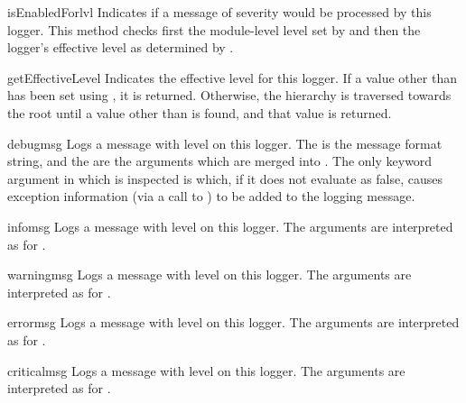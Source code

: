 \begin{methoddesc}{isEnabledFor}{lvl}
Indicates if a message of severity  would be processed by
this logger.  This method checks first the module-level level set by
 and then the logger's effective level as
determined by .
\end{methoddesc}

\begin{methoddesc}{getEffectiveLevel}{}
Indicates the effective level for this logger. If a value other than
 has been set using , it is returned.
Otherwise, the hierarchy is traversed towards the root until a value
other than  is found, and that value is returned.
\end{methoddesc}

\begin{methoddesc}{debug}{msg}
Logs a message with level  on this logger.
The  is the message format string, and the  are the
arguments which are merged into . The only keyword argument in
 which is inspected is  which, if it does not
evaluate as false, causes exception information (via a call to
) to be added to the logging message.
\end{methoddesc}

\begin{methoddesc}{info}{msg}
Logs a message with level  on this logger.
The arguments are interpreted as for .
\end{methoddesc}

\begin{methoddesc}{warning}{msg}
Logs a message with level  on this logger.
The arguments are interpreted as for .
\end{methoddesc}

\begin{methoddesc}{error}{msg}
Logs a message with level  on this logger.
The arguments are interpreted as for .
\end{methoddesc}

\begin{methoddesc}{critical}{msg}
Logs a message with level  on this logger.
The arguments are interpreted as for .
\end{methoddesc}


